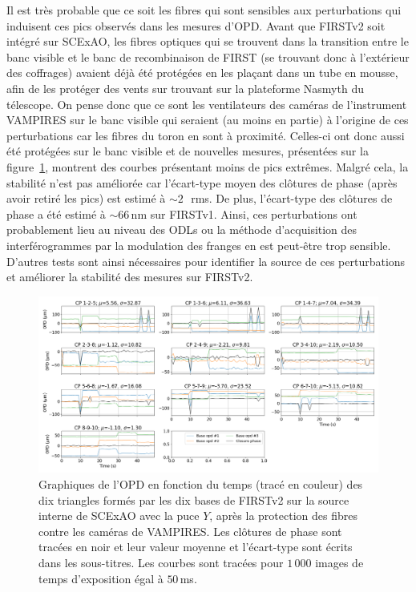 Il est très probable que ce soit les fibres qui sont sensibles aux perturbations qui induisent ces pics observés dans les mesures d'\ac{OPD}. Avant que \ac{FIRSTv2} soit intégré sur \ac{SCExAO}, les fibres optiques qui se trouvent dans la transition entre le banc visible et le banc de recombinaison de \ac{FIRST} (se trouvant donc à l'extérieur des coffrages) avaient déjà été protégées en les plaçant dans un tube en mousse, afin de les protéger des vents sur trouvant sur la plateforme Nasmyth du télescope. On pense donc que ce sont les ventilateurs des caméras de l'instrument \ac{VAMPIRES} sur le banc visible qui seraient (au moins en partie) à l'origine de ces perturbations car les fibres du toron en sont à proximité. Celles-ci ont donc aussi été protégées sur le banc visible et de nouvelles mesures, présentées sur la figure~\ref{fig:OPDfitVStimeSubaruProtect}, montrent des courbes présentant moins de pics extrêmes. Malgré cela, la stabilité n'est pas améliorée car l'écart-type moyen des clôtures de phase (après avoir retiré les pics) est estimé à $\sim 2 \,$\um~rms. De plus, l'écart-type des clôtures de phase a été estimé à $\sim 66 \,$nm sur \ac{FIRSTv1}. Ainsi, ces perturbations ont probablement lieu au niveau des \ac{ODL}s ou la méthode d'acquisition des interférogrammes par la modulation des franges en est peut-être trop sensible. D'autres tests sont ainsi nécessaires pour identifier la source de ces perturbations et améliorer la stabilité des mesures sur \ac{FIRSTv2}.

\begin{figure}[ht!]
    \centering
    \includegraphics[width=\figwidth]{Figure_Chap5/20220404_FullOnData_OPDFitCPvsTime_Pola1_Base_LaTex.png}
    \caption[Graphiques de l'OPD en fonction du temps des dix triangles formés par les dix bases de FIRSTv2 sur la source interne de SCExAO avec la puce $Y$, après la protection des fibres.]{Graphiques de l'OPD en fonction du temps (tracé en couleur) des dix triangles formés par les dix bases de FIRSTv2 sur la source interne de SCExAO avec la puce $Y$, après la protection des fibres contre les caméras de VAMPIRES. Les clôtures de phase sont tracées en noir et leur valeur moyenne et l'écart-type sont écrits dans les sous-titres. Les courbes sont tracées pour $1\,000$ images de temps d'exposition égal à $50 \,$ms.}
    \label{fig:OPDfitVStimeSubaruProtect}
\end{figure}


